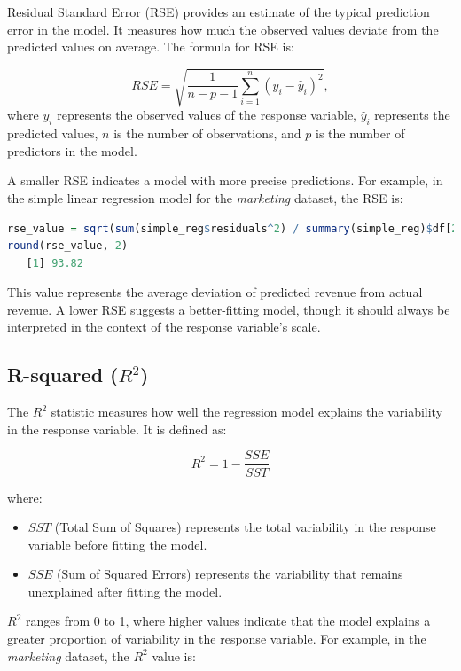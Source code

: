 \documentclass[
  11pt,
]{book}
\providecommand{\tightlist}{%
  \setlength{\itemsep}{0pt}\setlength{\parskip}{0pt}}
\theoremstyle{definition}
\theoremstyle{definition}
\theoremstyle{definition}
\theoremstyle{definition}
\theoremstyle{remark}
\begin{document}
Residual Standard Error (RSE) provides an estimate of the typical prediction error in the model. It measures how much the observed values deviate from the predicted values on average. The formula for RSE is:

\[
RSE = \sqrt{\frac{1}{n-p-1} \sum_{i=1}^{n} (y_i - \hat{y}_i)^2},
\]
where \(y_i\) represents the observed values of the response variable, \(\hat{y}_i\) represents the predicted values, \(n\) is the number of observations, and \(p\) is the number of predictors in the model.

A smaller RSE indicates a model with more precise predictions. For example, in the simple linear regression model for the \emph{marketing} dataset, the RSE is:

\begin{lstlisting}[language=R]
rse_value = sqrt(sum(simple_reg$residuals^2) / summary(simple_reg)$df[2])
round(rse_value, 2)
   [1] 93.82
\end{lstlisting}

This value represents the average deviation of predicted revenue from actual revenue. A lower RSE suggests a better-fitting model, though it should always be interpreted in the context of the response variable's scale.

\subsection*{\texorpdfstring{R-squared (\(R^2\))}{R-squared (R\^{}2)}}\label{r-squared-r2}


The \(R^2\) statistic measures how well the regression model explains the variability in the response variable. It is defined as:

\[
R^2 = 1 - \frac{SSE}{SST}
\]

where:

\begin{itemize}
\tightlist
\item
  \(SST\) (Total Sum of Squares) represents the total variability in the response variable before fitting the model.\\
\item
  \(SSE\) (Sum of Squared Errors) represents the variability that remains unexplained after fitting the model.
\end{itemize}

\(R^2\) ranges from 0 to 1, where higher values indicate that the model explains a greater proportion of variability in the response variable. For example, in the \emph{marketing} dataset, the \(R^2\) value is:
\end{document}
